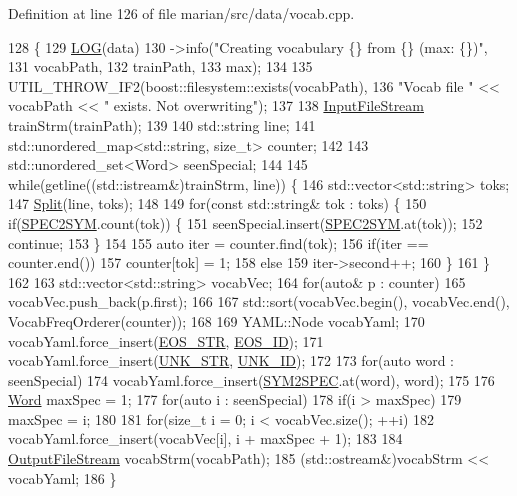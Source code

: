 Definition at line 126 of file marian/src/data/vocab.\+cpp.


\begin{DoxyCode}
128                                                \{
129   \hyperlink{amun_2common_2logging_8h_a8cad147aca8c526d3c8a03ae14d5c87d}{LOG}(data)
130       ->info(\textcolor{stringliteral}{"Creating vocabulary \{\} from \{\} (max: \{\})"},
131              vocabPath,
132              trainPath,
133              max);
134 
135   UTIL\_THROW\_IF2(boost::filesystem::exists(vocabPath),
136                  \textcolor{stringliteral}{"Vocab file "} << vocabPath << \textcolor{stringliteral}{" exists. Not overwriting"});
137 
138   \hyperlink{classInputFileStream}{InputFileStream} trainStrm(trainPath);
139 
140   std::string line;
141   std::unordered\_map<std::string, size\_t> counter;
142 
143   std::unordered\_set<Word> seenSpecial;
144 
145   \textcolor{keywordflow}{while}(getline((std::istream&)trainStrm, line)) \{
146     std::vector<std::string> toks;
147     \hyperlink{namespaceamunmt_a10b7486d36b130609c77e8356218c0a7}{Split}(line, toks);
148 
149     \textcolor{keywordflow}{for}(\textcolor{keyword}{const} std::string& tok : toks) \{
150       \textcolor{keywordflow}{if}(\hyperlink{namespacemarian_a53db7e8e290296787decc0fd95948535}{SPEC2SYM}.count(tok)) \{
151         seenSpecial.insert(\hyperlink{namespacemarian_a53db7e8e290296787decc0fd95948535}{SPEC2SYM}.at(tok));
152         \textcolor{keywordflow}{continue};
153       \}
154 
155       \textcolor{keyword}{auto} iter = counter.find(tok);
156       \textcolor{keywordflow}{if}(iter == counter.end())
157         counter[tok] = 1;
158       \textcolor{keywordflow}{else}
159         iter->second++;
160     \}
161   \}
162 
163   std::vector<std::string> vocabVec;
164   \textcolor{keywordflow}{for}(\textcolor{keyword}{auto}& p : counter)
165     vocabVec.push\_back(p.first);
166 
167   std::sort(vocabVec.begin(), vocabVec.end(), VocabFreqOrderer(counter));
168 
169   YAML::Node vocabYaml;
170   vocabYaml.force\_insert(\hyperlink{namespacemarian_ae9a4ff3b7d4df0a6ea4a710810c5b6f6}{EOS\_STR}, \hyperlink{namespacemarian_a58eb44c6e8969831f40ee27feeed33ed}{EOS\_ID});
171   vocabYaml.force\_insert(\hyperlink{namespacemarian_a85fabda4ef9ec625d0c992f81292dc92}{UNK\_STR}, \hyperlink{namespacemarian_abe23e32294ac45b7fe50b5ee8d7da9ba}{UNK\_ID});
172 
173   \textcolor{keywordflow}{for}(\textcolor{keyword}{auto} word : seenSpecial)
174     vocabYaml.force\_insert(\hyperlink{namespacemarian_a70398af3e3d1cc14ff372edcdc1a2595}{SYM2SPEC}.at(word), word);
175 
176   \hyperlink{namespacemarian_a5db8bee455c97a62d6a525dc48efe4c2}{Word} maxSpec = 1;
177   \textcolor{keywordflow}{for}(\textcolor{keyword}{auto} i : seenSpecial)
178     \textcolor{keywordflow}{if}(i > maxSpec)
179       maxSpec = i;
180 
181   \textcolor{keywordflow}{for}(\textcolor{keywordtype}{size\_t} i = 0; i < vocabVec.size(); ++i)
182     vocabYaml.force\_insert(vocabVec[i], i + maxSpec + 1);
183 
184   \hyperlink{classOutputFileStream}{OutputFileStream} vocabStrm(vocabPath);
185   (std::ostream&)vocabStrm << vocabYaml;
186 \}
\end{DoxyCode}


